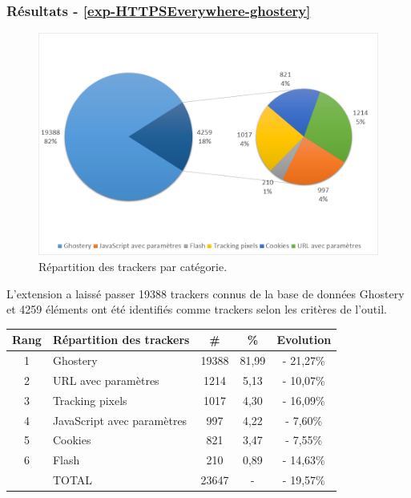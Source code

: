 \subsubsection{Résultats - \autoref{exp-HTTPSEverywhere-ghostery}}
\begin{figure}[!h]
	\centering
	\includegraphics[scale=.6]{resultats/ANALYSES/Images/HTTPSEverywhere-Ghostery.png}
	\caption{\label{exp-HTTPSEverywhere-ghostery}Répartition des trackers par catégorie.}
\end{figure}

L'extension a laissé passer 19388 trackers connus de la base de données Ghostery et 4259 éléments ont été identifiés comme trackers selon les critères de l'outil.\\

\begin{tabular}{ c | p{5cm} | c | c || c | }
   Rang & Répartition des trackers & \# & \% & Evolution \\
   \hline
   \hline
   1 & Ghostery & 19388 & 81,99 & - 21,27\% \\
   2 & URL avec paramètres & 1214 & 5,13 & - 10,07\% \\
   3 & Tracking pixels & 1017 & 4,30 & - 16,09\% \\
   4 & JavaScript avec paramètres & 997 & 4,22 & - 7,60\% \\
   5 & Cookies & 821 & 3,47 & - 7,55\% \\
   6 & Flash & 210 & 0,89 & - 14,63\% \\
   \hline
    & TOTAL & 23647 & - & - 19,57\%\\
   \hline
\end{tabular}
\\[1cm]

